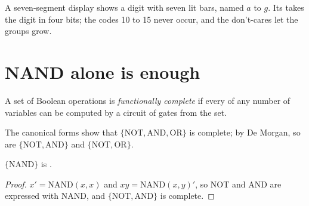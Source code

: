 A seven-segment display shows a digit with seven lit bars, named $a$ to $g$. Its  takes the digit in four bits;
the codes 10 to 15 never occur, and the don't-cares let the groups grow.

\label{out:b1:combinational-circuits:seven}

\section{NAND alone is enough}\label{sec:b1:combinational-circuits:nand}

\begin{definition}\label{def:b1:combinational-circuits:complete}
A set of Boolean operations is \emph{functionally complete} if every  of
any number of variables can be computed by a circuit of gates from the set.
\end{definition}

The canonical forms show that $\{\text{NOT}, \text{AND}, \text{OR}\}$ is complete; by De Morgan, so are $\{\text{NOT},
\text{AND}\}$ and $\{\text{NOT}, \text{OR}\}$.

\begin{proposition}\label{prop:b1:combinational-circuits:nand}
$\{\text{NAND}\}$ is .
\end{proposition}

\begin{proof}
$x' = \text{NAND}(x, x)$ and $xy = \text{NAND}(x, y)'$, so NOT and AND are expressed with NAND, and $\{\text{NOT},
\text{AND}\}$ is complete.
\end{proof}

\label{lst:b1:combinational-circuits:nand}

\label{out:b1:combinational-circuits:nand}

